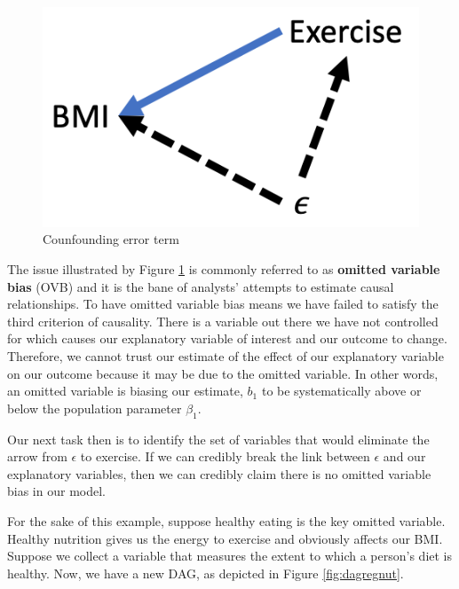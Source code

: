 \documentclass[
]{book}
\begin{document}
\begin{figure}

{\centering \includegraphics[width=\textwidth]{images/dag_regovb} 

}

\caption{Counfounding error term}\label{fig:dagregovb}
\end{figure}

The issue illustrated by Figure \ref{fig:dagregovb} is commonly referred to as \textbf{omitted variable bias} (OVB) and it is the bane of analysts' attempts to estimate causal relationships. To have omitted variable bias means we have failed to satisfy the third criterion of causality. There is a variable out there we have not controlled for which causes our explanatory variable of interest and our outcome to change. Therefore, we cannot trust our estimate of the effect of our explanatory variable on our outcome because it may be due to the omitted variable. In other words, an omitted variable is biasing our estimate, \(b_1\) to be systematically above or below the population parameter \(\beta_1\).

Our next task then is to identify the set of variables that would eliminate the arrow from \(\epsilon\) to exercise. If we can credibly break the link between \(\epsilon\) and our explanatory variables, then we can credibly claim there is no omitted variable bias in our model.

For the sake of this example, suppose healthy eating is the key omitted variable. Healthy nutrition gives us the energy to exercise and obviously affects our BMI. Suppose we collect a variable that measures the extent to which a person's diet is healthy. Now, we have a new DAG, as depicted in Figure \ref{fig:dagregnut}.
\end{document}
